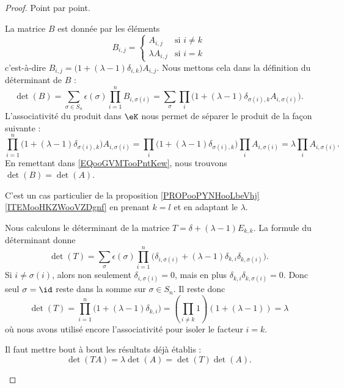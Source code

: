 \begin{proof}
	Point par point.
	\begin{subproof}
		\spitem[\ref{ITEMooBKIGooCDQEDt}]
		La matrice \( B\) est donnée par les éléments
		\begin{equation}
			B_{i,j}=\begin{cases}
				A_{i,j}         & \text{si } i\neq k \\
				\lambda A_{i,j} & \text{si } i=k
			\end{cases}
		\end{equation}
		c'est-à-dire \( B_{i,j}=\big( 1+(\lambda-1)\delta_{i,k} \big)A_{i,j}\). Nous mettons cela dans la définition du déterminant de \( B\) :
		\begin{equation}        \label{EQooGVMTooPntKew}
			\det(B)=\sum_{\sigma\in S_n}\epsilon(\sigma)\prod_{i=1}^n B_{i,\sigma(i)}=\sum_{\sigma}\prod_i\big( 1+(\lambda-1)\delta_{\sigma(i),k}A_{i,\sigma(i)} \big).
		\end{equation}
		L'associativité du produit dans \( \eK\) nous permet de séparer le produit de la façon suivante :
		\begin{equation}
			\prod_{i=1}^n\big( 1+(\lambda-1)\delta_{\sigma(i),k} \big)A_{i,\sigma(i)}=\prod_i\big( 1+(\lambda-1)\delta_{\sigma(i),k} \big)\prod_i A_{i,\sigma(i)}=\lambda\prod_i A_{i,\sigma(i)}.
		\end{equation}
		En remettant dans \eqref{EQooGVMTooPntKew}, nous trouvons \( \det(B)=\det(A)\).

		\spitem[\ref{ITEMooWRRCooFXkRNW}]
		C'est un cas particulier de la proposition \ref{PROPooPYNHooLbeVhj}\ref{ITEMooHKZWooVZDgnf} en prenant \( k=l\) et en adaptant le \( \lambda\).

		\spitem[\ref{ITEMooOGGDooPVVRzk}]
		Nous calculons le déterminant de la matrice \( T=\delta+(\lambda-1)E_{k,k}\). La formule du déterminant donne
		\begin{equation}
			\det(T)=\sum_{\sigma}\epsilon(\sigma)\prod_{i=1}^n\big( \delta_{i,\sigma(i)}+(\lambda-1)\delta_{k,i}\delta_{k,\sigma(i)} \big).
		\end{equation}
		Si \( i\neq \sigma(i)\), alors non seulement \( \delta_{i,\sigma(i)}=0\), mais en plus \( \delta_{k,i}\delta_{k,\sigma(i)}=0\). Donc seul \( \sigma=\id\) reste dans la somme sur \( \sigma\in S_n\). Il reste donc
		\begin{equation}
			\det(T)=\prod_{i=1}^n\big( 1+(\lambda-1)\delta_{k,i} \big)=\left( \prod_{i\neq k}1 \right)(1+(\lambda-1))=\lambda
		\end{equation}
		où nous avons utilisé encore l'associativité pour isoler le facteur \( i=k\).

		\spitem[\ref{ITEMooIFRVooWQYgkK}]
		Il faut mettre bout à bout les résultats déjà établis :
		\begin{equation}
			\det(TA)=\lambda\det(A)=\det(T)\det(A).
		\end{equation}
	\end{subproof}
\end{proof}

